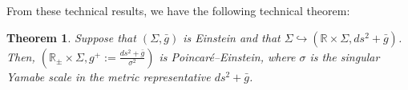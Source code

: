 \documentclass[a4paper,10.9pt]{amsart}
\newtheorem{theorem}{Theorem}[section]
\newtheorem{corollary}[theorem]{Corollary}
\theoremstyle{definition}
\theoremstyle{remark}
\def\sideremark#1{\ifvmode\leavevmode\fi\vadjust{\vbox to0pt{\vss
 \hbox to 0pt{\hskip\hsize\hskip1em
 \vbox{\hsize2cm\tiny\raggedright\pretolerance10000
  \noindent #1\hfill}\hss}\vbox to8pt{\vfil}\vss}}}
\newcommand{\edz}[1]{\sideremark{#1}}
\numberwithin{equation}{section}
\renewcommand{\=}{\stackrel \Sigma =}
\begin{document}
%
From these technical results, we have the following technical theorem:
\begin{theorem} \label{E-PE}
Suppose that $(\Sigma, \bar{g})$ is Einstein and that $\Sigma \hookrightarrow (\mathbb{R} \times \Sigma,ds^2 + \bar{g})$. Then, $(\mathbb{R}_{\pm} \times \Sigma , g^+ := \frac{ds^2 + \bar{g}}{\sigma^2})$ is Poincar\'e--Einstein, where $\sigma$ is the singular Yamabe scale in the metric representative $ds^2 + \bar{g}$.
\end{theorem}
\end{document}
